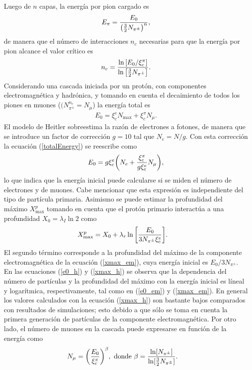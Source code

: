 		Luego de $n$ capas, la energía por pion cargado es
		\begin{align}
		E_{\pi} = \frac{E_0}{\qty(\frac{3}{2}N_{\pi^{\pm}})^n},
		\end{align}
		de manera que el número de interacciones $n_c$ necesarias para que la energía por pion alcance el valor crítico es
		\begin{align}
		n_c = \frac{\ln \qty[E_0 / \xi_c^{\pi}]}{\ln \qty[\frac{3}{2}N_{\pi^{\pm}}]}.
		\end{align}
		Considerando una cascada iniciada por un protón, con componentes electromagnética y hadrónica, y tomando en cuenta el decaimiento de todos los piones en muones ($(N_{\pi^{\pm}}^{n_c} = N_{\mu}$) la energía total es
		\begin{align} \label{totalEnergy}
		E_0 = \xi_c^e N_{\text{max}}+\xi_c^{\pi} N_{\mu}.
		\end{align}
		El modelo de Heitler sobreestima la razón de electrones a fotones, de manera que se introduce un factor de corrección $g=10$ tal que $N_e = N/g$. Con esta corrección la ecuación (\ref{totalEnergy}) se reescribe como
		\begin{align} \label{e0_h}
		E_0 = g \xi_{c}^{e} \qty(N_e + \frac{\xi_c^{\pi}}{g \xi_c^{e}} N_{\mu}),
		\end{align}
		lo que indica que la energía inicial puede calcularse si se miden el número de electrones y de muones. Cabe mencionar que esta expresión es independiente del tipo de partícula primaria. Asimismo se puede estimar la profundidad del máximo $X_{\text{max}}^{p}$ tomando en cuenta que el protón primario interactúa a una profundidad $X_0=\lambda_I \ln 2$ como
		\begin{align} \label{xmax_h}
		X_{\text{max}}^{p} &= X_0 + \lambda_r \ln \qty[\frac{E_0}{3 N_{\pi^{\pm}}\xi_c^e}].
		\end{align}
		El segundo término corresponde a la profundidad del máximo de la componente electromagnética de la ecuación (\ref{xmax_em}), cuya energía inicial es $E_0/3N_{\pi^{\pm}}$. En las ecuaciones (\ref{e0_h}) y (\ref{xmax_h}) se observa que la dependencia del número de partículas y la profundidad del máximo con la energía inicial es líneal y logarítmica, respectivamente, tal como en (\ref{e0_em}) y (\ref{xmax_em}). En general los valores calculados con la ecuación (\ref{xmax_h}) son bastante bajos comparados con resultados de simulaciones; esto debido a que sólo se toma en cuenta la primera generación de partículas de la componente electromagnética. Por otro lado, el número de muones en la cascada puede expresarse en función de la energía como
		\begin{align}
		N_{\mu} &= \qty(\frac{E_0}{\xi_c^{\pi}})^{\beta}, \text{ donde } \beta = \frac{\ln[N_{\pi^{\pm}}]}{\ln[\frac{3}{2}N_{\pi^{\pm}}]}.
		\end{align}

